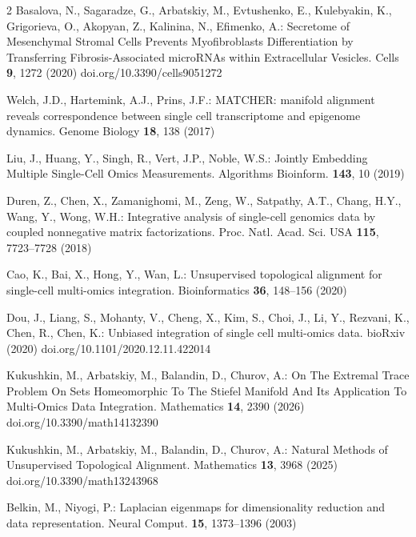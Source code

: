 \documentclass[a4paper,twoside,12pt]{article}
\begin{document}
\begin{thebibliography}{2}
  Basalova, N., Sagaradze, G., Arbatskiy, M., Evtushenko, E., Kulebyakin, K., Grigorieva, O., Akopyan, Z., Kalinina, N., Efimenko, A.:  Secretome of Mesenchymal Stromal Cells Prevents Myofibroblasts Differentiation by Transferring Fibrosis-Associated microRNAs within Extracellular Vesicles.   Cells  \textbf{9}, 1272 (2020)  doi.org/10.3390/cells9051272


    Welch, J.D.,  Hartemink, A.J.,  Prins, J.F.:  MATCHER: manifold alignment reveals
correspondence between single cell
transcriptome and epigenome dynamics.   Genome Biology  \textbf{18}, 138 (2017)


  Liu, J., Huang, Y., Singh, R., Vert, J.P., Noble, W.S.: Jointly Embedding Multiple Single-Cell Omics Measurements.  Algorithms Bioinform.  \textbf{143}, 10 (2019)



   Duren, Z., Chen, X., Zamanighomi, M., Zeng, W., Satpathy, A.T., Chang, H.Y., Wang, Y., Wong, W.H.:   Integrative analysis of single-cell genomics data by coupled nonnegative matrix factorizations.  Proc. Natl. Acad. Sci. USA  \textbf{115},     7723--7728 (2018)


   Cao, K., Bai, X., Hong, Y., Wan, L.:  Unsupervised topological alignment for single-cell multi-omics integration.  Bioinformatics    \textbf{36},       148--156  (2020)




   Dou, J., Liang, S., Mohanty, V., Cheng, X., Kim, S., Choi, J., Li, Y., Rezvani, K., Chen, R., Chen, K.:  Unbiased integration of single cell multi-omics data. bioRxiv  (2020)  doi.org/10.1101/2020.12.11.422014


 Kukushkin, M.,  Arbatskiy, M., Balandin, D., Churov, A.:  On The Extremal Trace Problem On Sets Homeomorphic To
The Stiefel Manifold And Its Application To Multi-Omics
Data Integration.    Mathematics  \textbf{14}, 2390 (2026)  doi.org/10.3390/math14132390


 Kukushkin, M.,  Arbatskiy, M., Balandin, D., Churov, A.:  Natural Methods of Unsupervised Topological Alignment.    Mathematics  \textbf{13}, 3968 (2025)  doi.org/10.3390/math13243968



    Belkin, M., Niyogi, P.:   Laplacian eigenmaps for
dimensionality reduction and data representation.
 Neural Comput.   \textbf{15},   1373--1396 (2003)




\end{thebibliography}
\end{document}
